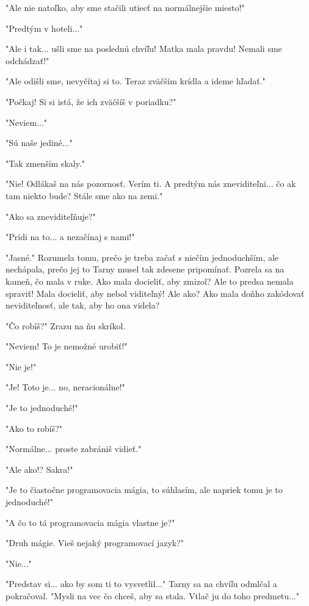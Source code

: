 \documentclass{book}
\begin{document}
"$ $Ale nie natoľko, aby sme stačili utiecť na normálnejšie miesto!"$ $ 

"$ $Predtým v hoteli..."$ $ 

"$ $Ale i tak... ušli sme na poslednú chvíľu! Matka mala pravdu! Nemali sme odchádzať!"$ $ 

"$ $Ale odišli sme, nevyčítaj si to. Teraz zväčším krídla a ideme hľadať."$ $ 

"$ $Počkaj! Si si istá, že ich zväčšíš v poriadku?"$ $ 

"$ $Neviem..."$ $ 

"$ $Sú naše jediné..."$ $ 

"$ $Tak zmenším skaly."$ $ 

"$ $Nie! Odlákaš na nás pozornosť. Verím ti. A predtým nás zneviditeľni... čo ak tam niekto bude? Stále sme ako na zemi."$ $ 

"$ $Ako sa zneviditeľňuje?"$ $ 

"$ $Prídi na to... a nezačínaj s nami!"$ $ 

"$ $Jasné."$ $  Rozumela tomu, prečo je treba začať s niečím jednoduchším, ale nechápala, prečo jej to Tarny musel tak zdesene pripomínať. Pozrela sa na kameň, čo mala v ruke. Ako mala docieliť, aby zmizol? Ale to predsa nemala spraviť! Mala docieliť, aby nebol viditeľný! Ale ako? Ako mala doňho zakódovať neviditeľnosť, ale tak, aby ho ona videla?

"$ $Čo robíš?"$ $  Zrazu na ňu skríkol.

"$ $Neviem! To je nemožné urobiť!"$ $ 

"$ $Nie je!"$ $ 

"$ $Je! Toto je... no, neracionálne!"$ $ 

"$ $Je to jednoduché!"$ $ 

"$ $Ako to robíš?"$ $ 

"$ $Normálne... proste zabrániš vidieť."$ $ 

"$ $Ale ako!? Sakra!"$ $ 

"$ $Je to čiastočne programovacia mágia, to súhlasím, ale napriek tomu je to jednoduché!"$ $ 

"$ $A čo to tá programovacia mágia vlastne je?"$ $ 

"$ $Druh mágie. Vieš nejaký programovací jazyk?"$ $ 

"$ $Nie..."$ $ 

"$ $Predstav si... ako by som ti to vysvetlil..."$ $  Tarny sa na chvíľu odmlčal a pokračoval. "$ $Mysli na vec čo chceš, aby sa stala. Vtlač ju do toho predmetu..."$ $ 
\end{document}
